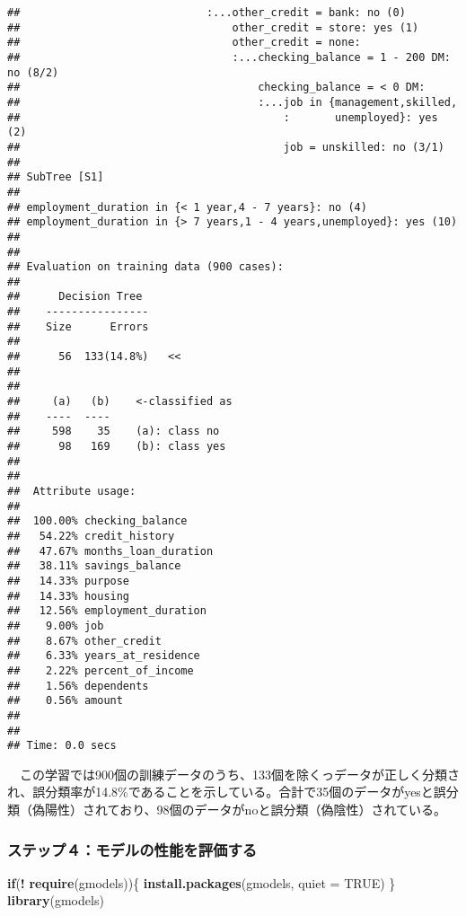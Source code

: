 \documentclass[
]{article}
\newenvironment{Shaded}{\begin{snugshade}}{\end{snugshade}}
\newcommand{\AttributeTok}[1]{\textcolor[rgb]{0.13,0.29,0.53}{#1}}
\newcommand{\ConstantTok}[1]{\textcolor[rgb]{0.56,0.35,0.01}{#1}}
\newcommand{\ControlFlowTok}[1]{\textcolor[rgb]{0.13,0.29,0.53}{\textbf{#1}}}
\newcommand{\FunctionTok}[1]{\textcolor[rgb]{0.13,0.29,0.53}{\textbf{#1}}}
\newcommand{\NormalTok}[1]{#1}
\newcommand{\SpecialCharTok}[1]{\textcolor[rgb]{0.81,0.36,0.00}{\textbf{#1}}}
\newcommand{\StringTok}[1]{\textcolor[rgb]{0.31,0.60,0.02}{#1}}
\begin{document}
\begin{verbatim}
##                             :...other_credit = bank: no (0)
##                                 other_credit = store: yes (1)
##                                 other_credit = none:
##                                 :...checking_balance = 1 - 200 DM: no (8/2)
##                                     checking_balance = < 0 DM:
##                                     :...job in {management,skilled,
##                                         :       unemployed}: yes (2)
##                                         job = unskilled: no (3/1)
## 
## SubTree [S1]
## 
## employment_duration in {< 1 year,4 - 7 years}: no (4)
## employment_duration in {> 7 years,1 - 4 years,unemployed}: yes (10)
## 
## 
## Evaluation on training data (900 cases):
## 
##      Decision Tree   
##    ----------------  
##    Size      Errors  
## 
##      56  133(14.8%)   <<
## 
## 
##     (a)   (b)    <-classified as
##    ----  ----
##     598    35    (a): class no
##      98   169    (b): class yes
## 
## 
##  Attribute usage:
## 
##  100.00% checking_balance
##   54.22% credit_history
##   47.67% months_loan_duration
##   38.11% savings_balance
##   14.33% purpose
##   14.33% housing
##   12.56% employment_duration
##    9.00% job
##    8.67% other_credit
##    6.33% years_at_residence
##    2.22% percent_of_income
##    1.56% dependents
##    0.56% amount
## 
## 
## Time: 0.0 secs
\end{verbatim}

　この学習では900個の訓練データのうち、133個を除くっデータが正しく分類され、誤分類率が14.8\%であることを示している。合計で35個のデータがyesと誤分類（偽陽性）されており、98個のデータがnoと誤分類（偽陰性）されている。

\subsubsection{ステップ４：モデルの性能を評価する}\label{ux30b9ux30c6ux30c3ux30d7uxff14ux30e2ux30c7ux30ebux306eux6027ux80fdux3092ux8a55ux4fa1ux3059ux308b}

\begin{Shaded}
\begin{Highlighting}[]
\ControlFlowTok{if}\NormalTok{(}\SpecialCharTok{!} \FunctionTok{require}\NormalTok{(gmodels))\{}
    \FunctionTok{install.packages}\NormalTok{(}\StringTok{\textquotesingle{}gmodels\textquotesingle{}}\NormalTok{, }\AttributeTok{quiet =} \ConstantTok{TRUE}\NormalTok{)}
\NormalTok{\}}
\FunctionTok{library}\NormalTok{(}\StringTok{\textquotesingle{}gmodels\textquotesingle{}}\NormalTok{)}
\end{Highlighting}
\end{Shaded}
\end{document}

